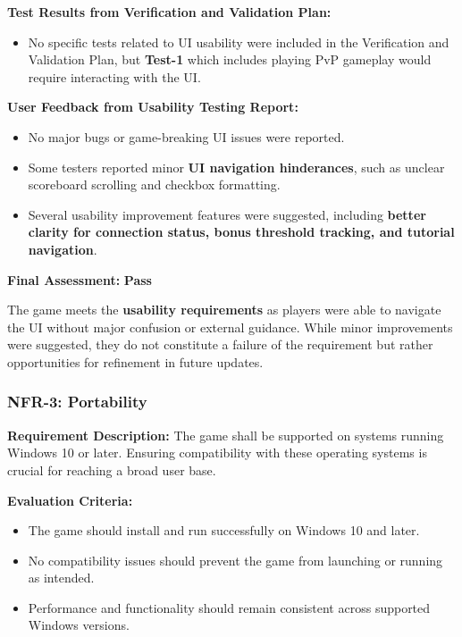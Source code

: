 \documentclass[12pt, titlepage]{article}
\begin{document}
\textbf{Test Results from Verification and Validation Plan:}  
\begin{itemize}
    \item No specific tests related to UI usability were included in the Verification and Validation Plan, but \textbf{Test-1} which includes playing PvP gameplay would require interacting with the UI.
\end{itemize}

\textbf{User Feedback from Usability Testing Report:}  
\begin{itemize}
    \item No major bugs or game-breaking UI issues were reported.
    \item Some testers reported minor \textbf{UI navigation hinderances}, such as unclear scoreboard scrolling and checkbox formatting.
    \item Several usability improvement features were suggested, including \textbf{better clarity for connection status, bonus threshold tracking, and tutorial navigation}.
\end{itemize}

\textbf{Final Assessment:} \textbf{Pass}  

The game meets the \textbf{usability requirements} as players were able to navigate the UI without major confusion or external guidance. While minor improvements were suggested, they do not constitute a failure of the requirement but rather opportunities for refinement in future updates.


\subsubsection{NFR-3: Portability}
\label{NFR3}

\textbf{Requirement Description:}  
The game shall be supported on systems running Windows 10 or later. Ensuring compatibility with these operating systems is crucial for reaching a broad user base.

\textbf{Evaluation Criteria:}  
\begin{itemize}
    \item The game should install and run successfully on Windows 10 and later.
    \item No compatibility issues should prevent the game from launching or running as intended.
    \item Performance and functionality should remain consistent across supported Windows versions.
\end{itemize}
\end{document}
